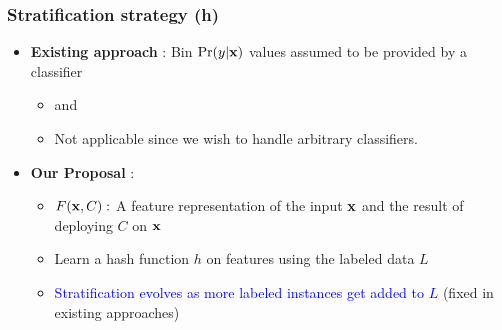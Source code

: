 \documentclass[usenames,dvipsnames, 11pt]{beamer}
\newcommand{\vek}[1]{{\bf {#1}}}
\newcommand{\vx}{{\vek{x}}}
\newlength{\wideitemsep}
\let\olditem\item
\renewcommand{\item}{\setlength{\itemsep}{\wideitemsep}\olditem}
\begin{document}
\begin{frame}
\frametitle{Stratification strategy (h)}
\begin{itemize}
\pause
\item \textbf{Existing approach} : Bin $\Pr(y|\vx)$ values assumed to be provided by a classifier 
  \begin{itemize}
  \item \citeauthor{bennett10} and \citeauthor{druck11} %
  \item Not applicable since we wish to handle arbitrary classifiers.
  \end{itemize}
  \pause  
\item \textbf{Our Proposal} : 
  \begin{itemize}
  \pause
  \item $F(\vx,C):$ A feature representation of the input $\vx$ and the result of deploying $C$ on  $\vx$
  \item Learn a hash function $h$ on features using the labeled data $L$
  \item \textcolor{Blue}{Stratification evolves as more labeled instances get added to $L$} (fixed in existing approaches)
  \end{itemize}
\end{itemize}
\end{frame}
\end{document}
